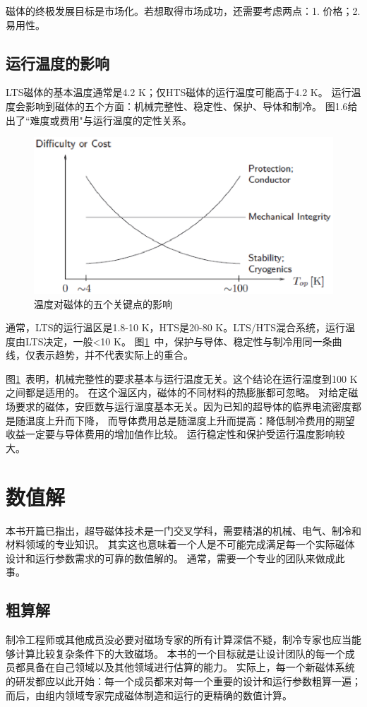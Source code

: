 磁体的终极发展目标是市场化。若想取得市场成功，还需要考虑两点：1. 价格；2. 易用性。

\subsection{运行温度的影响}
LTS磁体的基本温度通常是4.2 K；仅HTS磁体的运行温度可能高于4.2 K。
运行温度会影响到磁体的五个方面：机械完整性、稳定性、保护、导体和制冷。
图1.6给出了``难度或费用"与运行温度的定性关系。
\begin{figure}
  \centering
 \includegraphics[scale=0.6]{chpt1/figs/fig1.6.eps}
  \caption{
温度对磁体的五个关键点的影响
}\label{temperatureeffect}
\end{figure}

通常，LTS的运行温区是1.8-10 K，HTS是20-80 K。LTS/HTS混合系统，运行温度由LTS决定，一般<10 K。
图\ref{temperatureeffect}~中，保护与导体、稳定性与制冷用同一条曲线，仅表示趋势，并不代表实际上的重合。

图\ref{temperatureeffect}~表明，机械完整性的要求基本与运行温度无关。这个结论在运行温度到100 K之间都是适用的。
在这个温区内，磁体的不同材料的热膨胀都可忽略。
对给定磁场要求的磁体，安匝数与运行温度基本无关。因为已知的超导体的临界电流密度都是随温度上升而下降，
而导体费用总是随温度上升而提高：降低制冷费用的期望收益一定要与导体费用的增加值作比较。
运行稳定性和保护受运行温度影响较大。

\section{数值解}
本书开篇已指出，超导磁体技术是一门交叉学科，需要精湛的机械、电气、制冷和材料领域的专业知识。
其实这也意味着一个人是不可能完成满足每一个实际磁体设计和运行参数需求的可靠的数值解的。
通常，需要一个专业的团队来做成此事。
\subsection{粗算解}
制冷工程师或其他成员没必要对磁场专家的所有计算深信不疑，制冷专家也应当能够计算比较复杂条件下的大致磁场。
本书的一个目标就是让设计团队的每一个成员都具备在自己领域以及其他领域进行估算的能力。
实际上，每一个新磁体系统的研发都应以此开始：每一个成员都来对每一个重要的设计和运行参数粗算一遍；
而后，由组内领域专家完成磁体制造和运行的更精确的数值计算。

